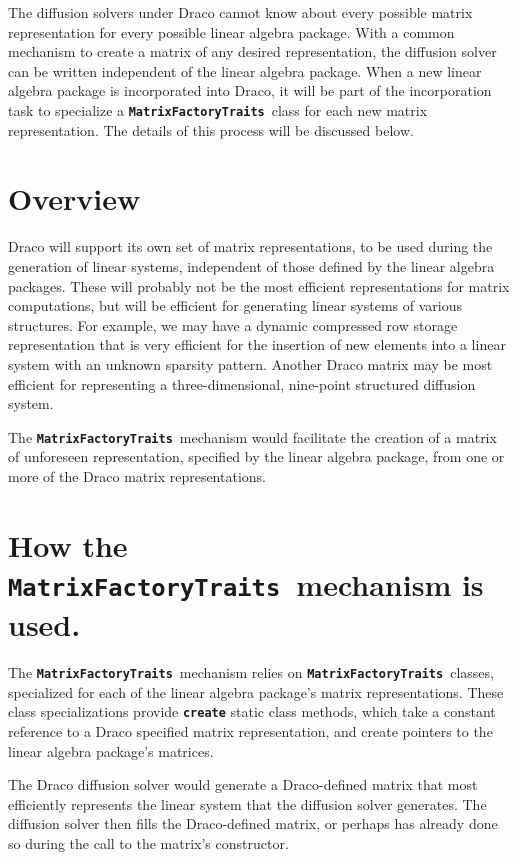 \documentclass[11pt]{nmemo}
\newcommand{\code}[1]{\textbf{\texttt{\textcolor{codecolor}{#1}}}}
\newcommand{\MFT}{\code{Matrix\-Factory\-Traits}\ }
\begin{document}
The diffusion solvers under Draco cannot know about every possible matrix
representation for every possible linear algebra package.
With a common mechanism to create a matrix of any desired representation,
the diffusion solver can be written independent of the linear algebra
package.
When a new linear algebra package is incorporated into Draco, it will be part
of the incorporation task to specialize a \MFT class
for each new matrix representation.
The details of this process will be discussed below.

\section{Overview}

Draco will support its own set of matrix representations, to be used during
the generation of linear systems, independent of those defined by the 
linear algebra packages.
These will probably not be the most efficient representations for matrix
computations, but will be efficient for generating linear systems of various
structures.
For example, we may have a dynamic compressed row storage representation that
is very efficient for the insertion of new elements into a linear
system with an unknown sparsity pattern.
Another Draco matrix may be most efficient for representing a three-dimensional,
nine-point structured diffusion system.

The \MFT mechanism would facilitate the creation
of a matrix of unforeseen representation, specified by the linear algebra
package, from one or more of the Draco matrix
representations.

\section{How the \MFT mechanism is used.}

The \MFT mechanism relies on \MFT classes, specialized for each
of the linear algebra package's matrix representations.
These class specializations
provide \code{create} static class methods, which take
a constant reference to a Draco specified matrix representation, and create
pointers to the linear algebra package's matrices.

The Draco diffusion solver would generate a Draco-defined matrix that most
efficiently represents the linear system that the diffusion solver generates.
The diffusion solver then fills the Draco-defined matrix, or perhaps has already
done so during the call to the matrix's constructor.
\end{document}
